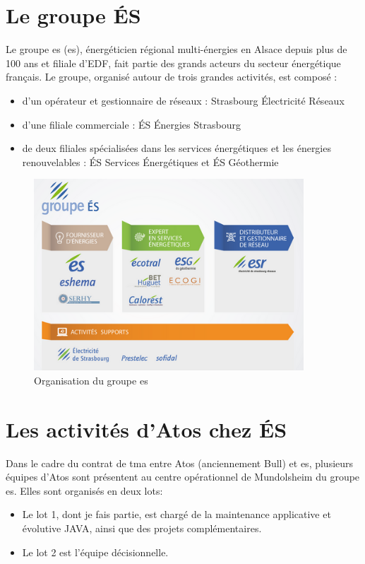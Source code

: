 \documentclass[12pt]{report}
\begin{document}
	\section{Le groupe ÉS}
	Le groupe \acrshort{es} (\acrlong{es}), énergéticien régional multi-énergies en Alsace depuis plus de 100 ans et filiale d'EDF, fait partie des grands acteurs du secteur énergétique français. Le groupe, organisé autour de trois grandes activités, est composé :
	\begin{itemize}
	    \item d’un opérateur et gestionnaire de réseaux : Strasbourg Électricité Réseaux
	    \item d'une filiale commerciale : ÉS Énergies Strasbourg
	    \item de deux filiales spécialisées dans les services énergétiques et les énergies renouvelables : ÉS Services Énergétiques et ÉS Géothermie
	\end{itemize}
	
	\begin{figure}[ht]
	    \centering
	    \includegraphics[width=0.9\textwidth]{img/orga_ES.png}
	    \caption{Organisation du groupe \acrshort{es}\cite{OrganisationES}}
	    \label{fig:orga_es}
	\end{figure}
	
	\newpage
	
	\section{Les activités d'Atos chez ÉS}
	Dans le cadre du contrat de \gls{tma} entre Atos (anciennement Bull) et \acrshort{es}, plusieurs équipes d'Atos sont présentent au centre opérationnel de Mundolsheim du groupe \acrshort{es}.
    Elles sont organisés en deux lots:
    \begin{itemize}
        \item Le lot 1, dont je fais partie, est chargé de la maintenance applicative et évolutive JAVA,  ainsi que des projets complémentaires.
        \item Le lot 2 est l’équipe décisionnelle.
    \end{itemize} 
    
\end{document}
